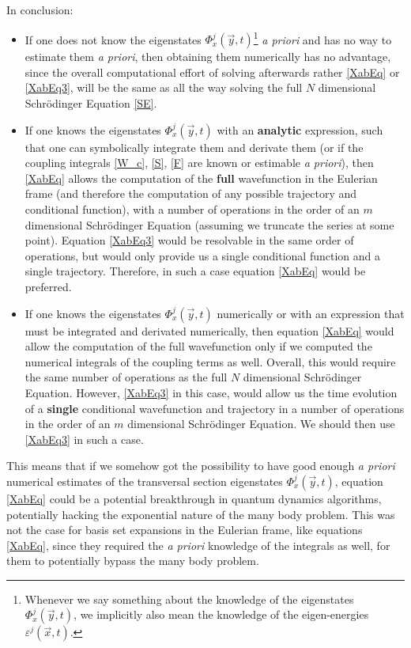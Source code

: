 \documentclass[11pt, a4paper]{article} %
\begin{document}
In conclusion:
\begin{itemize}
\item  If one does not know the eigenstates $\Phi^j_x(\vec{y},t)$\footnote{Whenever we say something about the knowledge of the eigenstates $\Phi^j_x(\vec{y},t)$, we implicitly also mean the knowledge of the eigen-energies $\varepsilon^j(\vec{x},t)$.} {\em a priori} and has no way to estimate them {\em a priori}, then obtaining them numerically has no advantage, since the overall computational effort of solving afterwards rather \eqref{XabEq} or \eqref{XabEq3}, will be the same as all the way solving the full $N$ dimensional Schrödinger Equation \eqref{SE}. 
\item If one knows the eigenstates $\Phi^j_x(\vec{y},t)$ with an {\bf analytic} expression, such that one can symbolically integrate them and derivate them (or if the coupling integrals \eqref{W_c}, \eqref{S}, \eqref{F} are known or estimable {\em a priori}), then \eqref{XabEq} allows the computation of the {\bf full} wavefunction in the Eulerian frame (and therefore the computation of any possible trajectory and conditional function), with a number of operations in the order of an $m$ dimensional Schrödinger Equation (assuming we truncate the series at some point). Equation \eqref{XabEq3} would be resolvable in the same order of operations, but would only provide us a single conditional function and a single trajectory. Therefore, in such a case equation \eqref{XabEq} would be preferred.
\item If one knows the eigenstates $\Phi^j_x(\vec{y},t)$ numerically or with an expression that must be integrated and derivated numerically, then equation \eqref{XabEq} would allow the computation of the full wavefunction only if we computed the numerical integrals of the coupling terms as well. Overall, this would require the same number of operations as the full $N$ dimensional Schrödinger Equation. However, \eqref{XabEq3} in this case, would allow us the time evolution of a {\bf single} conditional wavefunction and trajectory in a number of operations in the order of an $m$ dimensional Schrödinger Equation. We should then use \eqref{XabEq3} in such a case.

\end{itemize}
This means that if we somehow got the possibility to have good enough {\em a priori} numerical estimates of the transversal section eigenstates $\Phi^j_x(\vec{y},t)$, equation \eqref{XabEq} could be a potential breakthrough in quantum dynamics algorithms, potentially hacking the exponential nature of the many body problem. This was not the case for basis set expansions in the Eulerian frame, like equations \eqref{XabEq}, since they required the {\em a priori} knowledge of the integrals as well, for them to potentially bypass the many body problem.
\end{document}
